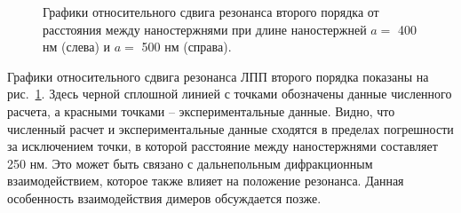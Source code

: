 
\begin{figure}
\caption{Графики относительного сдвига резонанса второго порядка от расстояния между наностержнями при длине наностержней $ a = $ 400 нм (слева) и $ a = $ 500 нм (справа).}
\label{img:shift}
\end{figure}

Графики относительного сдвига резонанса ЛПП второго порядка показаны на рис.~\ref{img:shift}. Здесь черной сплошной линией с точками обозначены данные численного расчета, а красными точками -- экспериментальные данные. Видно, что численный расчет и экспериментальные данные сходятся в пределах погрешности за исключением точки, в которой расстояние между наностержнями составляет 250 нм. Это может быть связано с дальнепольным дифракционным взаимодействием, которое также влияет на положение резонанса. Данная особенность взаимодействия димеров обсуждается позже.

